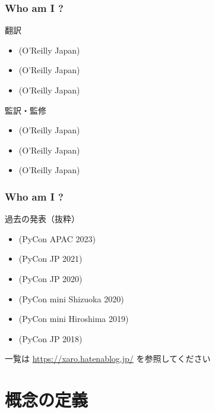 \documentclass[aspectratio=169,dvipdfmx,12pt,notheorems]{beamer}
\theoremstyle{definition}
\begin{document}
\begin{frame}\frametitle{Who am I ?}

\begin{block}{翻訳}
\begin{itemize}
\item {}(O'Reilly Japan) 
\item {}(O'Reilly Japan)
\item {}(O'Reilly Japan)
\end{itemize}
\end{block}

\begin{block}{監訳・監修}
\begin{itemize}
\item {}(O'Reilly Japan) 
\item {}(O'Reilly Japan)
\item {}(O'Reilly Japan)
\end{itemize}
\end{block}

\end{frame}

\begin{frame}\frametitle{Who am I ?}

\begin{block}{過去の発表（抜粋）}
\begin{itemize}
\item {}(PyCon APAC 2023)
\item {}(PyCon JP 2021)
\item {}(PyCon JP 2020)
\item {}(PyCon mini Shizuoka 2020)
\item {}(PyCon mini Hiroshima 2019)
\item {}(PyCon JP 2018)
\end{itemize}
\end{block}
一覧は \url{https://xaro.hatenablog.jp/} を参照してください
\end{frame}

\section{概念の定義}
\end{document}
